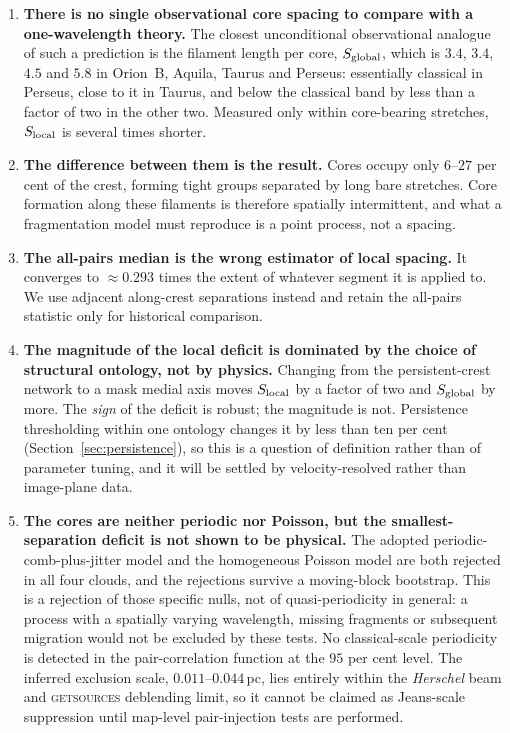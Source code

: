 \documentclass[usenatbib,twoside,twocolumn]{mnras}
\begin{document}
\begin{enumerate}\setlength{\itemsep}{2pt}
\item \textbf{There is no single observational core spacing to compare with a one-wavelength theory.} The closest unconditional observational analogue of such a prediction is the filament length per core, $S_{\rm global}$, which is $3.4$, $3.4$, $4.5$ and $5.8$ in Orion~B, Aquila, Taurus and Perseus: essentially classical in Perseus, close to it in Taurus, and below the classical band by less than a factor of two in the other two. Measured only within core-bearing stretches, $S_{\rm local}$ is several times shorter.
\item \textbf{The difference between them is the result.} Cores occupy only $6$--$27$ per cent of the crest, forming tight groups separated by long bare stretches. Core formation along these filaments is therefore spatially intermittent, and what a fragmentation model must reproduce is a point process, not a spacing.
\item \textbf{The all-pairs median is the wrong estimator of local spacing.} It converges to $\approx0.293$ times the extent of whatever segment it is applied to. We use adjacent along-crest separations instead and retain the all-pairs statistic only for historical comparison.
\item \textbf{The magnitude of the local deficit is dominated by the choice of structural ontology, not by physics.} Changing from the persistent-crest network to a mask medial axis moves $S_{\rm local}$ by a factor of two and $S_{\rm global}$ by more. The \emph{sign} of the deficit is robust; the magnitude is not. Persistence thresholding within one ontology changes it by less than ten per cent (Section~\ref{sec:persistence}), so this is a question of definition rather than of parameter tuning, and it will be settled by velocity-resolved rather than image-plane data.
\item \textbf{The cores are neither periodic nor Poisson, but the smallest-separation deficit is not shown to be physical.} The adopted periodic-comb-plus-jitter model and the homogeneous Poisson model are both rejected in all four clouds, and the rejections survive a moving-block bootstrap. This is a rejection of those specific nulls, not of quasi-periodicity in general: a process with a spatially varying wavelength, missing fragments or subsequent migration would not be excluded by these tests. No classical-scale periodicity is detected in the pair-correlation function at the $95$ per cent level. The inferred exclusion scale, $0.011$--$0.044$\,pc, lies entirely within the \textit{Herschel} beam and \textsc{getsources} deblending limit, so it cannot be claimed as Jeans-scale suppression until map-level pair-injection tests are performed.

\end{enumerate}
\end{document}
